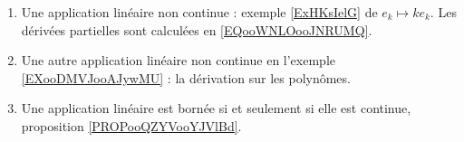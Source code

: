 
       \label{THEMEooYCBUooEnFdUg}
\begin{enumerate}
    \item
        Une application linéaire non continue : exemple \ref{ExHKsIelG} de \( e_k\mapsto ke_k\). Les dérivées partielles sont calculées en \eqref{EQooWNLOooJNRUMQ}.
    \item
        Une autre application linéaire non continue en l'exemple \ref{EXooDMVJooAJywMU} : la dérivation sur les polynômes.
    \item
        Une application linéaire est bornée si et seulement si elle est continue, proposition \ref{PROPooQZYVooYJVlBd}.
\end{enumerate}

